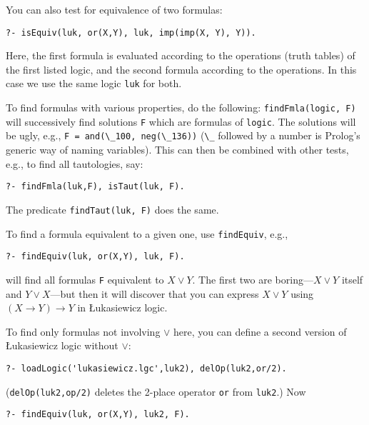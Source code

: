 \documentclass[
]{article}
\newcommand{\passthrough}[1]{#1}
\begin{document}
You can also test for equivalence of two formulas:

\begin{lstlisting}
?- isEquiv(luk, or(X,Y), luk, imp(imp(X, Y), Y)).
\end{lstlisting}

Here, the first formula is evaluated according to the operations (truth
tables) of the first listed logic, and the second formula according to
the operations. In this case we use the same logic
\passthrough{\lstinline!luk!} for both.

To find formulas with various properties, do the following:
\passthrough{\lstinline!findFmla(logic, F)!} will successively find
solutions \passthrough{\lstinline!F!} which are formulas of
\passthrough{\lstinline!logic!}. The solutions will be ugly, e.g.,
\passthrough{\lstinline!F = and(\_100, neg(\_136))!}
(\passthrough{\lstinline!\_!} followed by a number is Prolog's generic
way of naming variables). This can then be combined with other tests,
e.g., to find all tautologies, say:

\begin{lstlisting}
?- findFmla(luk,F), isTaut(luk, F).
\end{lstlisting}

The predicate \passthrough{\lstinline!findTaut(luk, F)!} does the same.

To find a formula equivalent to a given one, use
\passthrough{\lstinline!findEquiv!}, e.g.,

\begin{lstlisting}
?- findEquiv(luk, or(X,Y), luk, F).
\end{lstlisting}

will find all formulas \passthrough{\lstinline!F!} equivalent to
\(X \lor Y\). The first two are boring---\(X \lor Y\) itself and
\(Y \lor X\)---but then it will discover that you can express
\(X \lor Y\) using \((X \to Y) \to Y\) in Łukasiewicz logic.

To find only formulas not involving \(\lor\) here, you can define a
second version of Łukasiewicz logic without \(\lor\):

\begin{lstlisting}
?- loadLogic('lukasiewicz.lgc',luk2), delOp(luk2,or/2).
\end{lstlisting}

(\passthrough{\lstinline!delOp(luk2,op/2)!} deletes the 2-place operator
\passthrough{\lstinline!or!} from \passthrough{\lstinline!luk2!}.) Now

\begin{lstlisting}
?- findEquiv(luk, or(X,Y), luk2, F).
\end{lstlisting}
\end{document}
